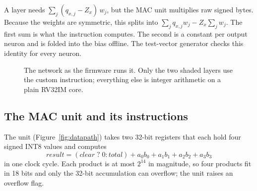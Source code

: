 \documentclass[10pt,a4paper]{article}
\begin{document}
A layer needs $\sum_j (q_{x,j}-Z_x)\,w_j$, but the MAC unit multiplies raw signed bytes. Because the weights are symmetric, this splits into $\sum_j q_{x,j}w_j - Z_x\sum_j w_j$. The first sum is what the instruction computes. The second is a constant per output neuron and is folded into the bias offline. The test-vector generator checks this identity for every neuron.

\begin{figure}[htbp]
\centering
{}
\caption{The network as the firmware runs it. Only the two shaded layers use the custom instruction; everything else is integer arithmetic on a plain RV32IM core.}
\label{fig:pipeline}
\end{figure}

\subsection{The MAC unit and its instructions}
The unit (Figure~\ref{fig:datapath}) takes two 32-bit registers that each hold four signed INT8 values and computes
\[
\mathit{result} = (\mathit{clear}\;?\;0 : \mathit{total}) + a_0b_0 + a_1b_1 + a_2b_2 + a_3b_3
\]
in one clock cycle. Each product is at most $2^{14}$ in magnitude, so four products fit in 18 bits and only the 32-bit accumulation can overflow; the unit raises an overflow flag.
\end{document}
